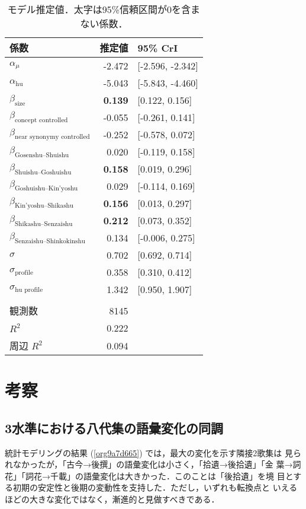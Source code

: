 \documentclass[submit]{ipsj}
\renewcommand{\ref}{\cref}
\begin{document}
\begin{table}[b]
\caption{\label{tab:org6d7b199}モデル推定値．太字は95\%信頼区間が0を含まない係数．}
\centering
\begin{tabular}{lrl}
係数 & 推定値 & 95\% CrI\\
\hline
\(\alpha_{\mu}\) & -2.472 & {[}-2.596, -2.342]\\
\(\alpha_{\text{hu}}\) & -5.043 & {[}-5.843, -4.460]\\
\(\beta_{\text{size}}\) & \textbf{0.139} & {[}0.122, 0.156]\\
\(\beta_{\text{concept controlled}}\) & -0.055 & {[}-0.261, 0.141]\\
\(\beta_{\text{near synonymy controlled}}\) & -0.252 & {[}-0.578, 0.072]\\
\(\beta_{\text{Gosenshu--Shuishu}}\) & 0.020 & {[}-0.119, 0.158]\\
\(\beta_{\text{Shuishu--Goshuishu}}\) & \textbf{0.158} & {[}0.019, 0.296]\\
\(\beta_{\text{Goshuishu--Kin'yoshu}}\) & 0.029 & {[}-0.114, 0.169]\\
\(\beta_{\text{Kin'yoshu--Shikashu}}\) & \textbf{0.156} & {[}0.013, 0.297]\\
\(\beta_{\text{Shikashu--Senzaishu}}\) & \textbf{0.212} & {[}0.073, 0.352]\\
\(\beta_{\text{Senzaishu--Shinkokinshu}}\) & 0.134 & {[}-0.006, 0.275]\\
\(\sigma\) & 0.702 & {[}0.692, 0.714]\\
\(\sigma_{\text{profile}}\) & 0.358 & {[}0.310, 0.412]\\
\(\sigma_{\text{hu profile}}\) & 1.342 & {[}0.950, 1.907]\\
 &  & \\
観測数 & 8145 & \\
\(R^2\) & 0.222 & \\
周辺 \(R^2\) & 0.094 & \\
\end{tabular}
\end{table}
\section{考察\label{orgb48aa9e}}
\label{sec:org6cdb6b3}
\subsection{3水準における八代集の語彙変化の同調\label{org7e2aa6e}}
\label{sec:org8d2c36f}
統計モデリングの結果 (\ref{org9a7d665}) では，最大の変化を示す隣接2歌集は
見られなかったが，「古今→後撰」の語彙変化は小さく，「拾遺→後拾遺」「金
葉→詞花」「詞花→千載」の語彙変化は大きかった．このことは「後拾遺」を境
目とする初期の安定性と後期の変動性を支持した．ただし，いずれも転換点と
いえるほどの大きな変化ではなく，漸進的と見做すべきである．
\end{document}
